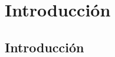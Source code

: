 %
%
%
%
%
%
%
%
%
%

\chapter{Introducci\'on}

\begin{FraseCelebre}
\begin{Frase}
\end{Frase}
\begin{Fuente}
\end{Fuente}
\end{FraseCelebre}

\section{Introducci\'on}
\label{cap1:sec:introduccion}


